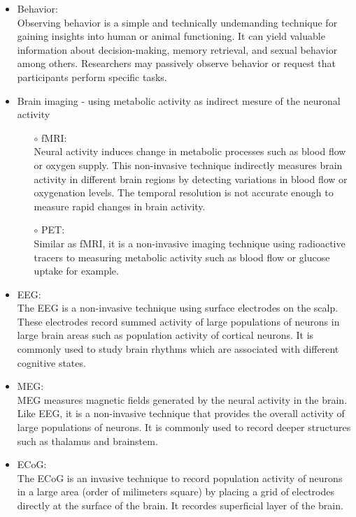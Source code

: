 \begin{itemize}
    \item Behavior:\\
    Observing behavior is a simple and technically undemanding technique for gaining insights into human or animal functioning. It can yield valuable information about decision-making, memory retrieval, and sexual behavior among others. Researchers may passively observe behavior or request that participants perform specific tasks. 
    \item Brain imaging - using metabolic activity as indirect mesure of the neuronal activity
    \begin{itemize}
        \item[$\circ$] \acrfull{fMRI}:\\
        Neural activity induces change in metabolic processes such as blood flow or oxygen supply. This non-invasive technique indirectly measures brain activity in different brain regions by detecting variations in blood flow or oxygenation levels. The temporal resolution is not accurate enough to measure rapid changes in brain activity.         
        \item[$\circ$] \acrfull{PET}:\\
        Similar as fMRI, it is a non-invasive imaging technique using radioactive tracers to measuring metabolic activity such as blood flow or glucose uptake for example. 
    \end{itemize}
    \item \acrfull{EEG}:\\
    The EEG is a non-invasive technique using surface electrodes on the scalp. These electrodes record summed activity of large populations of neurons in large brain areas such as population activity of cortical neurons. It is commonly used to study brain rhythms which are associated with different cognitive states. 
    \item \acrfull{MEG}: \\
    MEG measures magnetic fields generated by the neural activity in the brain. Like EEG, it is a non-invasive technique that provides the overall activity of large populations of neurons. It is commonly used to record deeper structures such as thalamus and brainstem. 
    \item \acrfull{ECoG}: \\
    The ECoG is an invasive technique to record population activity of neurons in a large area (order of milimeters square) by placing a grid of electrodes directly at the surface of the brain. It recordes superficial layer of the brain.

\end{itemize}

